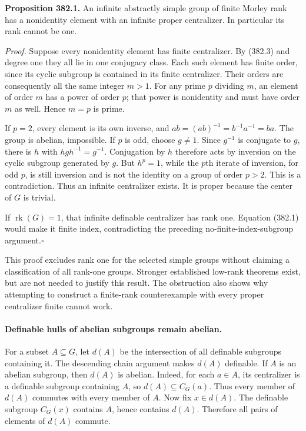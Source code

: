 \documentclass[11pt]{article}
\begin{document}
\textbf{Proposition 382.1.} An infinite abstractly simple group of
finite Morley rank has a nonidentity element with an infinite proper
centralizer. In particular its rank cannot be one.

\emph{Proof.} Suppose every nonidentity element has finite centralizer.
By (382.3) and degree one they all lie in one conjugacy class. Each
such element has finite order, since its cyclic subgroup is contained
in its finite centralizer. Their orders are consequently all the same
integer $m>1$. For any prime $p$ dividing $m$, an element of order
$m$ has a power of order $p$; that power is nonidentity and must have
order $m$ as well. Hence $m=p$ is prime.

If $p=2$, every element is its own inverse, and
$ab=(ab)^{-1}=b^{-1}a^{-1}=ba$. The group is abelian, impossible.
If $p$ is odd, choose $g\ne1$. Since $g^{-1}$ is conjugate to $g$,
there is $h$ with $hgh^{-1}=g^{-1}$. Conjugation by $h$ therefore
acts by inversion on the cyclic subgroup generated by $g$.
But $h^p=1$, while the $p$th iterate of inversion, for odd $p$, is
still inversion and is not the identity on a group of order $p>2$.
This is a contradiction. Thus an infinite centralizer exists.
It is proper because the center of $G$ is trivial.

If $\operatorname{rk}(G)=1$, that infinite definable centralizer has
rank one. Equation (382.1) would make it finite index, contradicting
the preceding no-finite-index-subgroup argument.\hfill$\square$

This proof excludes rank one for the selected simple groups without
claiming a classification of all rank-one groups. Stronger established
low-rank theorems exist, but are not needed to justify this result.
The obstruction also shows why attempting to construct a finite-rank
counterexample with every proper centralizer finite cannot work.

\paragraph{Definable hulls of abelian subgroups remain abelian.}
For a subset $A\subseteq G$, let $d(A)$ be the intersection of all
definable subgroups containing it. The descending chain argument makes
$d(A)$ definable. If $A$ is an abelian subgroup, then $d(A)$ is abelian.
Indeed, for each $a\in A$, its centralizer is a definable subgroup
containing $A$, so $d(A)\subseteq C_G(a)$. Thus every member of $d(A)$
commutes with every member of $A$. Now fix $x\in d(A)$. The definable
subgroup $C_G(x)$ contains $A$, hence contains $d(A)$. Therefore all
pairs of elements of $d(A)$ commute.
\end{document}
